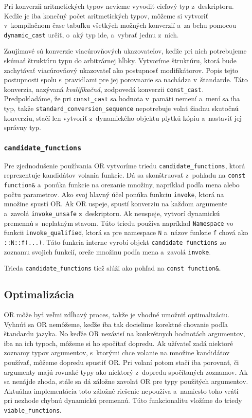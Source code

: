 Pri konverzii aritmetických typov nevieme vyvodiť cieľový typ z~deskriptoru. Keďže je iba konečný počet aritmetických typov, môžeme si vytvoriť v~kompilačnom čase tabuľku všetkých možných konverzií a~za behu pomocou \texttt{dynamic\_cast} určiť, o~aký typ ide, a~vybrať jednu z~nich.

Zaujímavé sú konverzie viacúrovňových ukazovateľov, keďže pri nich potrebujeme skúmať štruktúru typu do arbitrárnej hĺbky. Vytvoríme štruktúru, ktorá bude zachytávať viacúrovňový ukazovateľ ako postupnosť modifikátorov. Popis tejto postupnosti spolu s~pravidlami pre jej porovnanie sa nachádza v~štandarde. Táto konverzia, nazývaná \emph{kvalifikačná}, zodpovedá konverzii \texttt{const\_cast}. Predpokladáme, že pri \texttt{const\_cast} sa hodnota v~pamäti nemení a~mení sa iba typ, takže \texttt{standard\_conversion\_sequence} nepotrebuje volať žiadnu skutočnú konverziu, stačí len vytvoriť z~dynamického objektu plytkú kópiu a~nastaviť jej správny typ.

\subsubsection{\texttt{candidate\_functions}}

Pre zjednodušenie používania OR vytvoríme triedu \texttt{candidate\_functions}, ktorá reprezentuje kandidátov volania funkcie. Dá sa skonštruovať z~pohľadu na \texttt{const function\&} a~ponúka funkcie na orezanie množiny, napríklad podľa mena alebo počtu parametrov. Ako svoj hlavný účel ponúka funkciu \texttt{invoke}, ktorá na množine spustí OR. Ak OR uspeje, spustí konverziu na každom argumente a~zavolá \texttt{invoke\_unsafe} z~deskriptoru. Ak neuspeje, vytvorí dynamickú premennú s~neplatným stavom. Túto triedu používa napríklad \texttt{Namespace} vo funkcii \texttt{invoke\_qualified}, ktorá sa pre namespace \texttt{N} a~názov funkcie \texttt{f} chová ako \texttt{::N::f(...)}. Táto funkcia interne vyrobí objekt \texttt{candidate\_functions} zo zoznamu svojich funkcií, oreže množinu podľa mena a~zavolá \texttt{invoke}.

Trieda \texttt{candidate\_functions} tiež slúži ako pohľad na \texttt{const function\&}.

\subsection{Optimalizácia}

OR môže byť veľmi zdĺhavý proces, takže je vhodné umožniť optimalizáciu. Vyhnúť sa OR nemôžeme, keďže iba tak docielime korektné chovanie podľa štandardu jazyka. No keďže OR nezávisí na konkrétnych hodnotách argumentov, iba na ich typoch, môžeme si ho spočítať dopredu. Ak užívateľ zadá niektoré zoznamy typov argumentov, s~ktorými chce volanie na množine kandidátov používať, môžeme dopredu spustiť OR. Pri volaní potom stačí iba porovnať, či argumenty majú rovnaké typy ako niektorý z~dopredu spočítaných zoznamov. Ak sa nenájde zhoda, stále sa dá záložne zavolať OR pre typy použitých argumentov. Aktuálna implementácia toto záložné riešenie nepoužíva a~namiesto toho vráti pri nezhode chybnú dynamickú premennú. Túto funkcionalitu vložíme do triedy \texttt{viable\_functions}.

